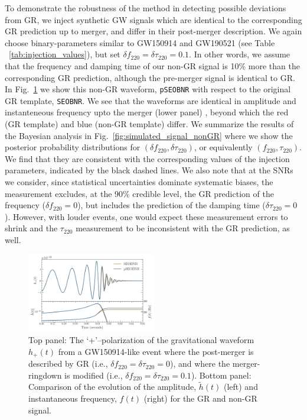 \documentclass[twocolumn,prd,aps,superscriptaddress,preprintnumbers,tightenlines,showpacs,nofootinbib,eqsecnum,amsfonts,amsmath]{revtex4-1}
\newcommand{\df}[1]{\delta f_{\text{#1}}}
\newcommand{\dtau}[1]{\delta \tau_{\text{#1}}}
\newcommand{\fngr}[1]{f_{\text{#1}}}
\newcommand{\taungr}[1]{\tau_{\text{#1}}}
\begin{document}
To demonstrate the robustness of the method in detecting possible
deviations from GR, we inject synthetic GW signals which are identical
to the corresponding GR prediction up to merger, and differ in their
post-merger description. We again choose binary-parameters similar to
GW150914 and GW190521 (see Table ~\ref{tab:injection_values}), but set
$\df{220} = \dtau{220} = 0.1 $.  In other words, we assume that the
frequency and damping time of our non-GR signal is 10\% more than the
corresponding GR prediction, although the pre-merger signal is
identical to GR. In Fig.~\ref{fig:nongr_waveform} we show this non-GR
waveform, \texttt{pSEOBNR} with respect to the original GR template,
\texttt{SEOBNR}. We see that the waveforms are identical in amplitude
and instanteneous frequency upto the merger (lower panel) , beyond
which the red (GR template) and blue (non-GR template) differ. We
summarize the results of the Bayesian analysis in
Fig.~\ref{fig:simulated_signal_nonGR} where we show the posterior
probability distributions for $(\df{220}, \dtau{220})$, or
equivalently $(\fngr{220}, \taungr{220})$. We find that they are
consistent with the corresponding values of the injection parameters,
indicated by the black dashed lines.  We also note that at the
  SNRs we consider, since statistical uncertainties dominate
  systematic biases, the measurement excludes, at the 90\% credible
  level, the GR prediction of the frequency ($\df{220}=0$), but
  includes the prediction of the damping time
  ($\dtau{220}=0$). However, with louder events, one would expect
  these measurement errors to shrink and the $\taungr{220}$
  measurement to be inconsistent with the GR prediction, as well.

\begin{figure}
        \includegraphics[width=0.5\textwidth]{figures/modGR_waveforms_amplitudephase.png}
        \caption{Top panel: The `+'--polarization of the gravitational waveform $h_+(t)$ from a GW150914-like event where the post-merger is described by GR (i.e., $\df{220} = \dtau{220} = 0$), and where the merger-ringdown is modified (i.e., $\df{220} = \dtau{220} = 0.1$). Bottom panel: Comparison of the evolution of the amplitude, $\tilde{h}(t)$ (left) and instantaneous frequency, $f(t)$ (right) for the GR and non-GR signal.}
        \label{fig:nongr_waveform}
\end{figure}
\end{document}
